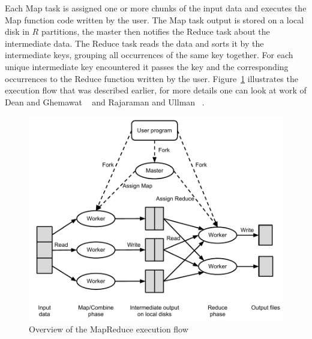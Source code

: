 Each Map task is assigned one or more chunks of the input data and executes the Map function code written by the user. The Map task output is stored on a local disk in $R$ partitions, the master then notifies the Reduce task about the intermediate data. The Reduce task reads the data and sorts it by the intermediate keys, grouping all occurrences of the same key together. For each unique intermediate key encountered it passes the key and the corresponding occurrences to the Reduce function written by the user. Figure~\ref{fig:mapreduce} illustrates the execution flow that was described earlier, for more details one can look at work of Dean and Ghemawat ~\citep{Dean:2004} and Rajaraman and Ullman ~\citep{Rajaraman:2011MMD}.
\begin{figure}[here]
\centerline{\includegraphics[width=1.0\textwidth]{Figures/MapReduceexecutionflow.pdf}}
\caption{Overview of the MapReduce execution flow}
\label{fig:mapreduce}
\end{figure}